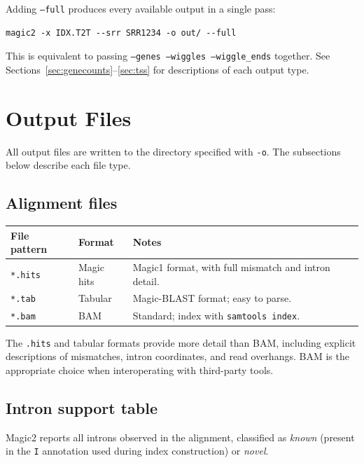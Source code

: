 \documentclass[11pt]{article}
\newcommand{\code}[1]{\texttt{#1}}
\begin{document}
Adding \code{--full} produces every available output in a single pass:
\begin{lstlisting}
magic2 -x IDX.T2T --srr SRR1234 -o out/ --full
\end{lstlisting}
This is equivalent to passing \code{--genes --wiggles --wiggle\_ends}
together.  See Sections~\ref{sec:genecounts}--\ref{sec:tss} for
descriptions of each output type.

\section{Output Files}

All output files are written to the directory specified with \code{-o}.
The subsections below describe each file type.

\subsection{Alignment files}

\begin{center}
\begin{tabular}{ll p{7.5cm}}
\toprule
\textbf{File pattern} & \textbf{Format} & \textbf{Notes} \\
\midrule
\code{*.hits}         & Magic hits      & Magic1 format, with full mismatch and intron detail. \\
\code{*.tab}          & Tabular         & Magic-BLAST format; easy to parse. \\
\code{*.bam}          & BAM             & Standard; index with \code{samtools index}. \\
\bottomrule
\end{tabular}
\end{center}

The \code{.hits} and tabular formats provide more detail than BAM,
including explicit descriptions of mismatches, intron coordinates, and
read overhangs.  BAM is the appropriate choice when interoperating with
third-party tools.

\subsection{Intron support table}

Magic2 reports all introns observed in the alignment, classified as
\emph{known} (present in the \code{I} annotation used during index
construction) or \emph{novel}.
\end{document}
